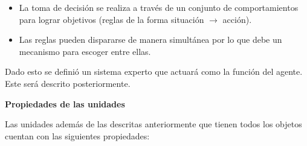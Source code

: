 \begin{itemize}
	\item La toma de decisión se realiza a través de un conjunto de comportamientos para lograr objetivos (reglas de la forma situación $\rightarrow$ acción).
	\item Las reglas pueden dispararse de manera simultánea por lo que debe un mecanismo para escoger entre ellas.	
\end{itemize}

Dado esto se definió un sistema experto que actuará como la función del agente. Este será descrito posteriormente.

\textbf{Propiedades de las unidades}

Las unidades además de las descritas anteriormente que tienen todos los objetos cuentan con las siguientes propiedades:

